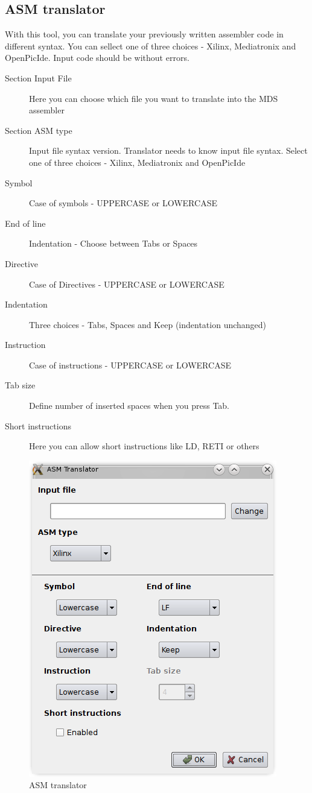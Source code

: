 \subsection{ASM translator}
    With this tool, you can translate your previously written assembler code in different syntax.
    You can sellect one of three choices - Xilinx, Mediatronix and OpenPicIde. Input code should be without
    errors.
    \begin{description}
        \item[Section Input File] Here you can choose which file you want to translate into the MDS assembler
        \item[Section ASM type] Input file syntax version. Translator needs to know input file syntax. Select one of three choices - Xilinx, Mediatronix and OpenPicIde
        \item[Symbol] Case of symbols - UPPERCASE or LOWERCASE
        \item[End of line] Indentation - Choose between Tabs or Spaces
        \item[Directive] Case of Directives - UPPERCASE or LOWERCASE
        \item[Indentation] Three choices - Tabs, Spaces and Keep (indentation unchanged)
        \item[Instruction] Case of instructions - UPPERCASE or LOWERCASE
        \item[Tab size]  Define number of inserted spaces when you press Tab.
        \item[Short instructions] Here you can allow short instructions like LD, RETI or others
    \end{description}

    \begin{figure}[h]
        \centering{}
        \includegraphics[width=.5\textwidth]{img/ASM_translator.png}
        \caption{ASM translator}
    \end{figure}

